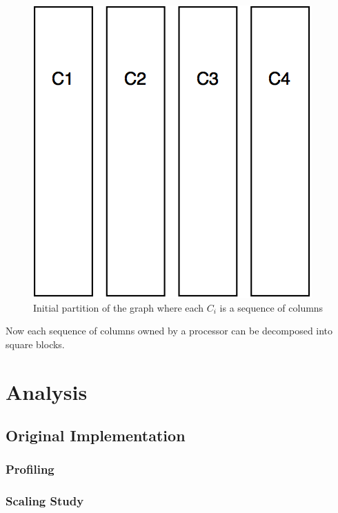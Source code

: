 \documentclass[11pt]{article}
\begin{document}
\begin{figure}
\centering
\includegraphics[scale=0.2]{initial_partition.png}
\caption{Initial partition of the graph where each $C_i$ is a sequence of columns}
\label{fig:init_part}
\end{figure}

Now each sequence of columns owned by a processor can be decomposed into square blocks.

\section{Analysis}

\subsection{Original Implementation}
\subsubsection{Profiling} \label{sec:prof}
\subsubsection{Scaling Study} \label{sec:speedup}
\end{document}
